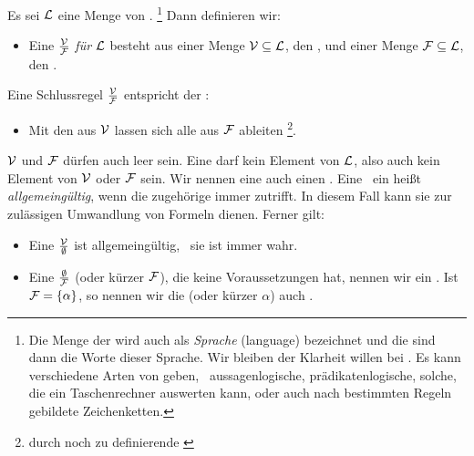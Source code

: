 Es sei $\mathcal{L}$ eine Menge von .%
	\footnote{%
	Die Menge der  wird auch als \emph{Sprache} (language) bezeichnet und die  sind dann die Worte dieser Sprache.
	Wir bleiben der Klarheit willen bei .\newline
	Es kann verschiedene Arten von  geben, \textzB\ aussagenlogische, prädikatenlogische, solche, die ein Taschenrechner auswerten kann, oder auch nach bestimmten Regeln gebildete Zeichenketten.
}
Dann definieren wir:
\begin{itemize}
	\item[] Eine \emph{} $\frac{\mathcal{V}}{\mathcal{F}}$ \emph{für} $\mathcal{L}$ besteht aus einer Menge $\mathcal{V}\subseteq\mathcal{L}$, den , und einer Menge $\mathcal{F}\subseteq\mathcal{L}$, den .
\end{itemize}
Eine Schlussregel $\frac{\mathcal{V}}{\mathcal{F}}$ entspricht der :
%
\begin{itemize}
	\item[] Mit den  aus $\mathcal{V}$ lassen sich alle  aus $\mathcal{F}$ ableiten%
	\footnote{durch noch zu definierende \emph{}}.
\end{itemize}
%
$\mathcal{V}$ und $\mathcal{F}$ dürfen auch leer sein.
Eine  darf kein Element von $\mathcal{L}$, also auch kein Element von $\mathcal{V}$ oder $\mathcal{F}$ sein.
Wir nennen eine  auch einen \emph{}.
Eine  \textbzw\ ein  heißt \emph{allgemeingültig}, wenn die zugehörige  immer zutrifft.
In diesem Fall kann sie zur zulässigen Umwandlung von Formeln dienen.
Ferner gilt:
%
\begin{itemize}
	\item Eine  $\frac{\mathcal{V}}{\emptyset}$ ist allgemeingültig, \textdh\ sie ist immer wahr.
	\item Eine  $\frac{\emptyset}{\mathcal{F}}$ (oder kürzer $\mathcal{F}$), die keine Voraussetzungen hat, nennen wir ein \emph{}.
	Ist $\mathcal{F} = \{\alpha\}$, so nennen wir die  (oder kürzer $\alpha$) auch \emph{}.
\end{itemize}

